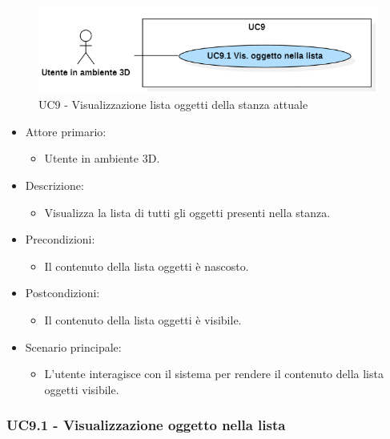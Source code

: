 \begin{figure}[H]
  \renewcommand{\thefigure}{5}
  \includegraphics[width=\linewidth]{./res/images/UC9.png}
  \caption{UC9 - Visualizzazione lista oggetti della stanza attuale}
  \label{fig:UC 9}
\end{figure}

\begin{itemize}

	\item Attore primario: 
	\begin{itemize}
		\item Utente in ambiente 3D.
	\end{itemize}
	\item Descrizione:
	\begin{itemize}
		\item Visualizza la lista di tutti gli oggetti presenti nella stanza.
	\end{itemize}
	
	\item Precondizioni:
	\begin{itemize}
		\item Il contenuto della lista oggetti è nascosto.
	\end{itemize}
	
	\item Postcondizioni:
	\begin{itemize}
		\item Il contenuto della lista oggetti è visibile.
	\end{itemize}
	
	\item Scenario principale:
	\begin{itemize}
		\item L'utente interagisce con il sistema per rendere il contenuto della lista oggetti visibile.
	\end{itemize}
	
\end{itemize}


\subsubsection{UC9.1 - Visualizzazione oggetto nella lista}

